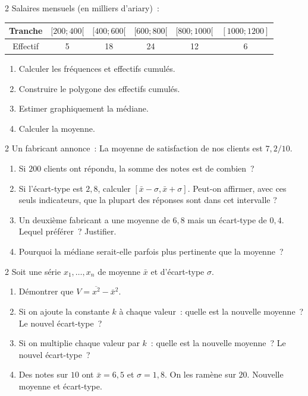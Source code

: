 \begin{exo}{2}
Salaires mensuels (en milliers d'ariary)~:
\begin{center}
\begin{tabular}{|c|c|c|c|c|c|}
\hline
\rowcolor{BN!10}
Tranche & $[200;400[$ & $[400;600[$ & $[600;800[$ & $[800;1000[$ & $[1000;1200]$ \\
\hline
Effectif & 5 & 18 & 24 & 12 & 6 \\
\hline
\end{tabular}
\end{center}
\begin{enumerate}
  \item Calculer les fr\'equences et effectifs cumul\'es.
  \item Construire le polygone des effectifs cumul\'es.
  \item Estimer graphiquement la m\'ediane.
  \item Calculer la moyenne.
\end{enumerate}
\end{exo}

\begin{exo}{2}
Un fabricant annonce~:
\og La moyenne de satisfaction de nos clients est $7{,}2/10$.\fg
\begin{enumerate}
  \item Si $200$ clients ont r\'epondu, la somme des notes est de combien~?
  \item Si l'\'ecart-type est $2{,}8$, calculer
        $[\bar{x}-\sigma,\bar{x}+\sigma]$. Peut-on affirmer, avec ces seuls
        indicateurs, que la plupart des r\'eponses sont dans cet intervalle ?
  \item Un deuxi\`eme fabricant a une moyenne de $6{,}8$ mais un \'ecart-type
        de $0{,}4$. Lequel pr\'ef\'erer~? Justifier.
  \item Pourquoi la m\'ediane serait-elle parfois plus pertinente
        que la moyenne~?
\end{enumerate}
\end{exo}

\begin{exo}{2}
Soit une s\'erie $x_1,\ldots,x_n$ de moyenne $\bar{x}$ et d'\'ecart-type $\sigma$.
\begin{enumerate}
  \item D\'emontrer que $V = \overline{x^2} - \bar{x}^2$.
  \item Si on ajoute la constante $k$ \`a chaque valeur~: quelle est la
        nouvelle moyenne~? Le nouvel \'ecart-type~?
  \item Si on multiplie chaque valeur par $k$~: quelle est la nouvelle
        moyenne~? Le nouvel \'ecart-type~?
  \item Des notes sur $10$ ont $\bar{x}=6{,}5$ et $\sigma=1{,}8$.
        On les ramène sur $20$. Nouvelle moyenne et \'ecart-type.
\end{enumerate}
\end{exo}

